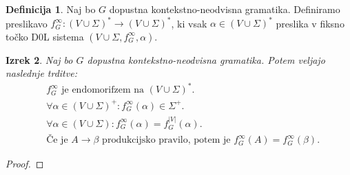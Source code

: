 \documentclass{amsart}
\theoremstyle{definition}
\newtheorem{definicija}{Definicija}[section]
\theoremstyle{plain} %
\newtheorem{izrek}[definicija]{Izrek}
\begin{document}
\begin{definicija}

    Naj bo $G$ dopustna kontekstno-neodvisna gramatika. Definiramo preslikavo
    $ f_G^\infty \colon (V \cup \Sigma)^* \to (V \cup \Sigma)^* $, ki vsak 
    $ \alpha \in (V \cup \Sigma)^* $ preslika v fiksno točko D0L sistema $ (V \cup \Sigma, f_G^\infty, \alpha) $.
    
\end{definicija}

\begin{izrek}

    Naj bo $G$ dopustna kontekstno-neodvisna gramatika. Potem veljajo naslednje trditve:
    \begin{align}
        & f_G^\infty \text{ je endomorifzem na } (V \cup \Sigma)^*. \\
        & \forall \alpha \in (V \cup \Sigma)^+ \colon f_G^\infty(\alpha) \in \Sigma^+. \\
        & \forall \alpha \in (V \cup \Sigma) \colon f_G^\infty(\alpha) = f_G^{|V|}(\alpha). \\
        &\text{Če je } A \rightarrow \beta \text{ produkcijsko pravilo, potem je } f_G^\infty(A) = f_G^\infty(\beta).
    \end{align}
    
\end{izrek}

\begin{proof}
    
\end{proof}
\end{document}
